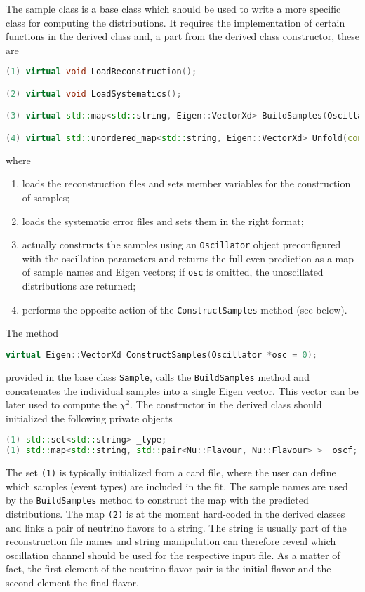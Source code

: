 \documentclass[a4paper, 11pt]{article}
\begin{document}
The sample class is a base class which should be used to write a more specific class for computing the distributions.
It requires the implementation of certain functions in the derived class and, a part from the derived class constructor, these are
\begin{lstlisting}[language=C++]
(1) virtual void LoadReconstruction();

(2) virtual void LoadSystematics();

(3) virtual std::map<std::string, Eigen::VectorXd> BuildSamples(Oscillator *osc = 0);

(4) virtual std::unordered_map<std::string, Eigen::VectorXd> Unfold(const Eigen::VectorXd &En);
\end{lstlisting}
where
\begin{enumerate}
	\item loads the reconstruction files and sets member variables for the construction of samples;
	\item loads the systematic error files and sets them in the right format;
	\item actually constructs the samples using an \texttt{Oscillator} object preconfigured with the oscillation parameters %
		and returns the full even prediction as a map of sample names and Eigen vectors; if \texttt{osc} is omitted, %
		the unoscillated distributions are returned;
	\item performs the opposite action of the \texttt{ConstructSamples} method (see below).
\end{enumerate}
The method 
\begin{lstlisting}[language=C++]
    virtual Eigen::VectorXd ConstructSamples(Oscillator *osc = 0);
\end{lstlisting}
provided in the base class \texttt{Sample}, calls the \texttt{BuildSamples} method and concatenates the individual samples %
into a single Eigen vector.
This vector can be later used to compute the $\chi^2$.
The constructor in the derived class should initialized the following private objects 
\begin{lstlisting}[language=C++]
(1) std::set<std::string> _type;
(1) std::map<std::string, std::pair<Nu::Flavour, Nu::Flavour> > _oscf;
\end{lstlisting}
The set \texttt{(1)} is typically initialized from a card file, where the user can define which samples (event types) are included in the fit.
The sample names are used by the \texttt{BuildSamples} method to construct the map with the predicted distributions.
The map \texttt{(2)} is at the moment hard-coded in the derived classes and links a pair of neutrino flavors to a string.
The string is usually part of the reconstruction file names and string manipulation can therefore reveal which %
oscillation channel should be used for the respective input file.
As a matter of fact, the first element of the neutrino flavor pair is the initial flavor and the second element the final flavor.
\end{document}
